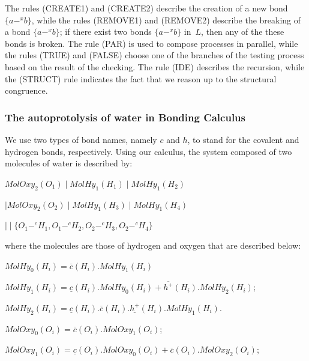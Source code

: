 \documentclass[runningheads]{llncs}
\newcommand{\MolOxy}{\mathit{MolOxy}}
\newcommand{\MolHy}{\mathit{MolHy}}
\begin{document}
The rules {\sf (CREATE1)} and {\sf (CREATE2)} describe the creation of a 
new bond $\{a-^x b\}$, while the rules {\sf (REMOVE1)} and {\sf (REMOVE2)} 
describe the breaking of a bond $\{a-^x b\}$; if there exist two bonds 
$\{a-^x b\}$ in~$L$, then any of the these bonds is broken. The rule 
{\sf (PAR}) is used to compose processes in parallel, while the rules 
{\sf (TRUE}) and {\sf (FALSE}) choose one of the branches of the testing 
process based on the result of the checking. The rule {\sf (IDE)} describes 
the recursion, while the {\sf (STRUCT)} rule indicates the fact that we reason 
up to the structural congruence.


\subsubsection{The autoprotolysis of water in Bonding Calculus}We use two types of bond names, namely $c$ and $h$, 
to stand for the covalent and hydrogen bonds, respectively. Using our  
calculus, the system composed of two molecules of water is described by:

\begin{center}
$MolOxy_2(O_1) \mid \MolHy_1(H_1) \mid \MolHy_1(H_2) $
\end{center}
\begin{center}
$\mid \MolOxy_2(O_2) \mid \MolHy_1(H_3) \mid \MolHy_1(H_4) $
\end{center}
\begin{center}
$\mid\mid \{O_1 -^c H_1, O_1 -^c H_2, O_2 -^c H_3, O_2 -^c H_4\}$
\end{center}


\noindent 
where the molecules are those of hydrogen and oxygen that are described below:
\vspace{1mm}

$\MolHy_0(H_i) = \overline{c}(H_i).\MolHy_1(H_i)$
\vspace{1mm}

$\MolHy_1(H_i) = \underline{c}(H_i).\MolHy_0(H_i) + \overline{h^+}(H_i).\MolHy_2(H_i)$;
\vspace{1mm}

$\MolHy_2(H_i) = \underline{c}(H_i).\overline{c}(H_i).\underline{h^+}(H_i).\MolHy_{1}(H_i)$.
\vspace{1mm}

$\MolOxy_0(O_i) = \overline{c}(O_i).\MolOxy_1(O_i)$;
\vspace{1mm}

$\MolOxy_1(O_i) = \underline{c}(O_i).\MolOxy_0(O_i) +\overline{c}(O_i).\MolOxy_2(O_i)$;
\vspace{1mm}
\end{document}
